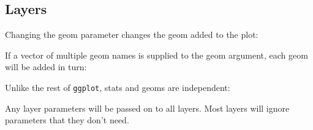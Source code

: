 \subsection{Layers}

Changing the geom parameter changes the geom added to the plot:

\begin{Shaded}
\begin{Highlighting}[]
  \NormalTok{)}
\StringTok{ }\NormalTok{()}
\end{Highlighting}
\end{Shaded}

If a vector of multiple geom names is supplied to the geom argument,
each geom will be added in turn:

\begin{Shaded}
\begin{Highlighting}[]
  \NormalTok{(}\NormalTok{, }\NormalTok{))}
\StringTok{ }\NormalTok{() +}\StringTok{ }\NormalTok{()}
\end{Highlighting}
\end{Shaded}

Unlike the rest of \texttt{ggplot}, stats and geoms are independent:

\begin{Shaded}
\begin{Highlighting}[]
  \NormalTok{)}
\StringTok{ }\NormalTok{(} \NormalTok{)  }
\end{Highlighting}
\end{Shaded}

Any layer parameters will be passed on to all layers. Most layers will
ignore parameters that they don't need.

\begin{Shaded}
\begin{Highlighting}[]
  \NormalTok{(}\NormalTok{, }\NormalTok{), }
   \NormalTok{)}
\StringTok{ }
\StringTok{  }\NormalTok{(} \NormalTok{) +}\StringTok{ }\NormalTok{(} \NormalTok{)}
\end{Highlighting}
\end{Shaded}

